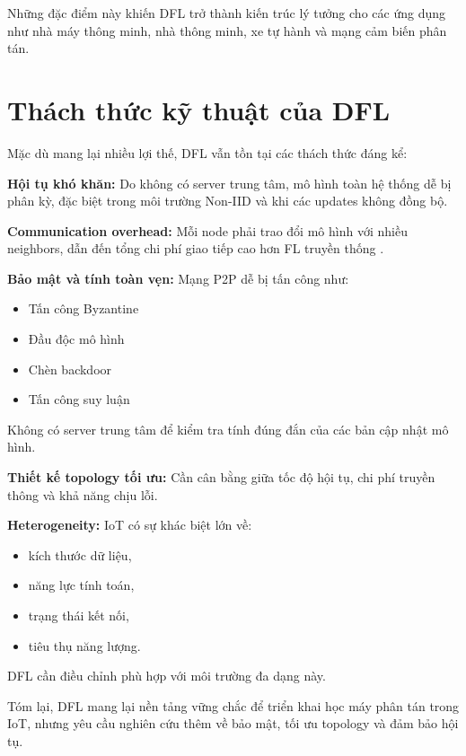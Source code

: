 Những đặc điểm này khiến DFL trở thành kiến trúc lý tưởng cho các ứng dụng như 
nhà máy thông minh, nhà thông minh, xe tự hành và mạng cảm biến phân tán.

\section{Thách thức kỹ thuật của DFL}

\hspace{0.6cm}Mặc dù mang lại nhiều lợi thế, DFL vẫn tồn tại các thách thức đáng kể:

\textbf{Hội tụ khó khăn:}  
Do không có server trung tâm, mô hình toàn hệ thống dễ bị phân kỳ, đặc biệt trong 
môi trường Non-IID \cite{li2018} và khi các updates không đồng bộ.

\textbf{Communication overhead:}  
Mỗi node phải trao đổi mô hình với nhiều neighbors, dẫn đến tổng chi phí giao tiếp 
cao hơn FL truyền thống \cite{kairouz2019}.

\textbf{Bảo mật và tính toàn vẹn:}  
Mạng P2P dễ bị tấn công như:

\begin{itemize}
    \item Tấn công Byzantine
    \item Đầu độc mô hình
    \item Chèn backdoor
    \item Tấn công suy luận
\end{itemize}

Không có server trung tâm để kiểm tra tính đúng đắn của các bản cập nhật mô hình.

\textbf{Thiết kế topology tối ưu:}  
Cần cân bằng giữa tốc độ hội tụ, chi phí truyền thông và khả năng chịu lỗi.

\textbf{Heterogeneity:}  
IoT có sự khác biệt lớn về:

\begin{itemize}
    \item kích thước dữ liệu,
    \item năng lực tính toán,
    \item trạng thái kết nối,
    \item tiêu thụ năng lượng.
\end{itemize}

DFL cần điều chỉnh phù hợp với môi trường đa dạng này.

Tóm lại, DFL mang lại nền tảng vững chắc để triển khai học máy phân tán trong IoT, 
nhưng yêu cầu nghiên cứu thêm về bảo mật, tối ưu topology và đảm bảo hội tụ.


